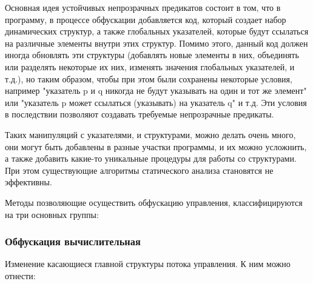 Основная идея устойчивых непрозрачных предикатов состоит в том, что в программу, в процессе обфускации добавляется код, который создает набор динамических структур, а также глобальных указателей, которые будут ссылаться на различные элементы внутри этих структур. Помимо этого, данный код должен иногда обновлять эти структуры (добавлять новые элементы в них, объединять или разделять некоторые их них, изменять значения глобальных указателей, и т.д.), но таким образом, чтобы при этом были сохранены некоторые условия, например "указатель p и q никогда не будут указывать на один и тот же элемент" или "указатель p может ссылаться (указывать) на указатель q" и т.д. Эти условия в последствии позволяют создавать требуемые непрозрачные предикаты.

Таких манипуляций с указателями, и структурами, можно делать очень много, они могут быть добавлены в разные участки программы, и их можно усложнить, а также добавить какие-то уникальные процедуры для работы со структурами. При этом существующие алгоритмы статического анализа становятся не эффективны.

Методы позволяющие осуществить обфускацию управления, классифицируются на три основных группы: 

\subsubsection{Обфускация вычислительная}

Изменение касающиеся главной структуры потока управления. К ним можно отнести:

